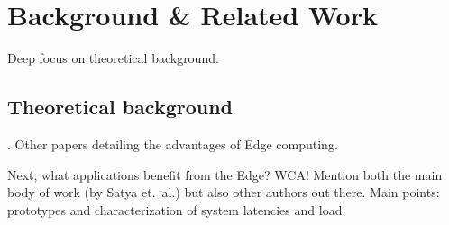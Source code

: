 \chapter{Background \& Related Work}

Deep focus on theoretical background.

\section{Theoretical background}
\textcite{Satya2009Case}.
Other papers detailing the advantages of Edge computing.

Next, what applications benefit from the Edge?
\ac{WCA}! Mention both the main body of work (by Satya et.\ al.) but also other authors out there.
Main points: prototypes and characterization of system latencies and load.
